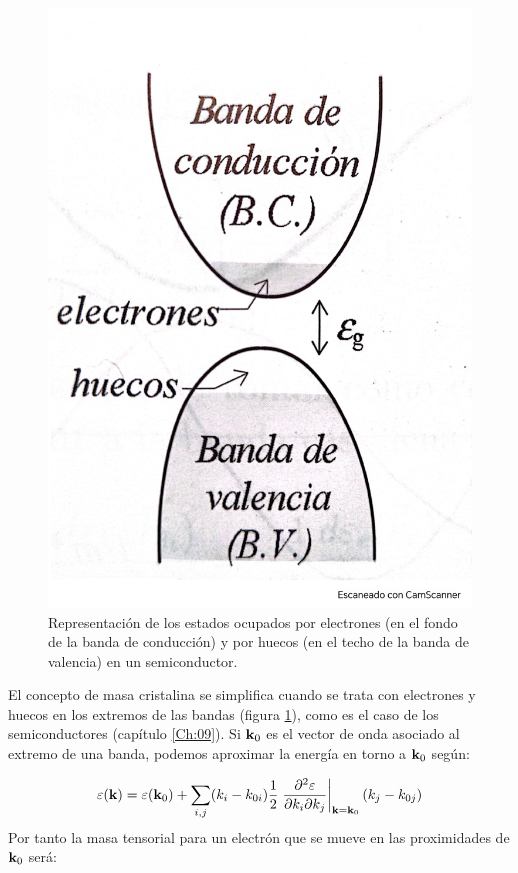 \begin{figure}[h!] \centering
	\includegraphics[scale=0.35]{Cuerpo/Ch_08/Fotos libro 1.pdf}
	\caption{Representación de los estados ocupados por electrones (en el fondo de la banda de conducción) y por huecos (en el techo de la banda de valencia) en un semiconductor.}
	\label{Fig:08-01}
\end{figure}


El concepto de masa cristalina se simplifica cuando se trata con electrones y huecos en los extremos de las bandas (figura \ref{Fig:08-01}), como es el caso de los semiconductores (capítulo \ref{Ch:09}). Si $\mathbf{k}_0$ es el vector de onda asociado al extremo de una banda, podemos aproximar la energía en torno a $\mathbf{k}_0$ según:

\begin{equation}
	\varepsilon(\mathbf{k}) = \varepsilon(\mathbf{k}_0) + \sum_{i,j} (k_i - k_{0i}) \frac{1}{2} \left. \frac{\partial ^2 \varepsilon}{\partial  k_i \partial k_j} \right|_{\mathbf{k}=\mathbf{k}_0} (k_j - k_{0j}) \label{Ec:08-02-04}
\end{equation} 
Por tanto la masa tensorial para un electrón que se mueve en las proximidades de $\mathbf{k}_0$ será:


